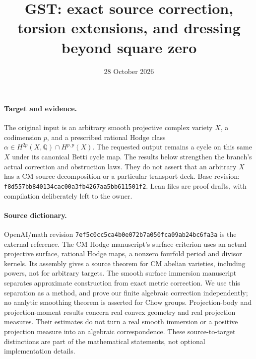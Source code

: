 \documentclass[11pt]{article}
\title{GST: exact source correction, torsion extensions, and dressing beyond square zero}
\date{28 October 2026}
\newcommand{\Q}{\mathbb Q}
\begin{document}
\maketitle

\paragraph{Target and evidence.}
The original input is an arbitrary smooth projective complex variety $X$,
a codimension $p$, and a prescribed rational Hodge class
$\alpha\in H^{2p}(X,\Q)\cap H^{p,p}(X)$.
The requested output remains a cycle on this same $X$ under its canonical
Betti cycle map. The results below strengthen the branch's actual
correction and obstruction laws. They do not assert that an arbitrary $X$
has a CM source decomposition or a particular transport deck.
Base revision: \texttt{f8d557bb840134cac00a3fb4267aa5bb611501f2}.
Lean files are proof drafts, with compilation deliberately left to the owner.

\paragraph{Source dictionary.}
OpenAI/math revision \texttt{7ef5c0cc5ca4b0e072b7a050fca09ab24bc6fa3a}
is the external reference. The CM Hodge manuscript's surface criterion
uses an actual projective surface, rational Hodge maps, a nonzero fourfold
period and divisor kernels. Its assembly gives a source theorem for CM
abelian varieties, including powers, not for arbitrary targets.
The smooth surface immersion manuscript separates approximate construction
from exact metric correction. We use this separation as a method, and prove
our finite algebraic correction independently; no analytic smoothing theorem
is asserted for Chow groups. Projection-body and projection-moment results
concern real convex geometry and real projection measures. Their estimates
do not turn a real smooth immersion or a positive projection measure into
an algebraic correspondence. These source-to-target distinctions are part
of the mathematical statements, not optional implementation details.
\end{document}
